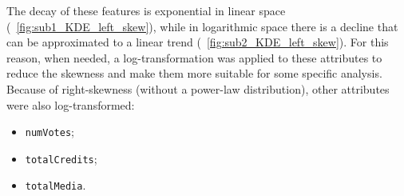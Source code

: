 The decay of these features is exponential in linear space (~\ref{fig:sub1_KDE_left_skew}), while in logarithmic space there is a decline that can be approximated to a linear trend (~\ref{fig:sub2_KDE_left_skew}). 
For this reason, when needed, a log-transformation was applied to these attributes to reduce the skewness and make
them more suitable for some specific analysis.
Because of right-skewness (without a power-law distribution), other attributes were also log-transformed:
\begin{itemize}
    \item \texttt{numVotes};
    \item \texttt{totalCredits};
    \item \texttt{totalMedia}.
\end{itemize}



